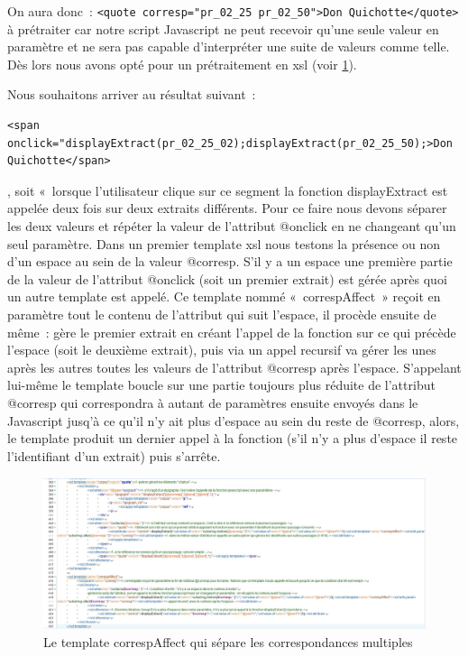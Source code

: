 \documentclass[12pt, a4paper]{article}
\begin{document}
On aura donc~: \verb|<quote corresp="pr_02_25 pr_02_50">Don Quichotte</quote>| à prétraiter car notre script Javascript ne peut recevoir qu'une seule valeur en paramètre et ne sera pas capable d'interpréter une suite de valeurs comme telle. Dès lors nous avons opté pour un prétraitement en xsl (voir \ref{fig:corrspAfect}).


Nous souhaitons arriver au résultat suivant~: \begin{verbatim}<span onclick="displayExtract(pr_02_25_02);displayExtract(pr_02_25_50);>Don
Quichotte</span>\end{verbatim}, soit «~lorsque l'utilisateur clique sur ce segment la fonction displayExtract est appelée deux fois sur deux extraits différents. Pour ce faire nous devons séparer les deux valeurs et répéter la valeur de l'attribut @onclick en ne changeant qu'un seul paramètre. Dans un premier template xsl nous testons la présence ou non d'un espace au sein de la valeur @corresp. S'il y a un espace une première partie de la valeur de l'attribut @onclick (soit un premier extrait) est gérée après quoi un autre template est appelé. Ce template nommé «~correspAffect~» reçoit en paramètre tout le contenu de l'attribut qui suit l'espace, il procède ensuite de même~: gère le premier extrait en créant l'appel de la fonction sur ce qui précède l'espace (soit le deuxième extrait), puis via un appel recursif va gérer les unes après les autres toutes les valeurs de l'attribut @corresp après l'espace. S'appelant lui-même le template boucle sur une partie toujours plus réduite de l'attribut @corresp qui correspondra à autant de paramètres ensuite envoyés dans le Javascript jusq'à ce qu'il n'y ait plus d'espace au sein du reste de @corresp, alors, le template produit un dernier appel à la fonction (s'il n'y a plus d'espace il reste l'identifiant d'un extrait) puis s'arrête.

\begin{figure}[H]
    \centering
    \includegraphics[scale=0.5]{img/screen_quote_xsl.jpg}
    \caption{Le template correspAffect qui sépare les correspondances multiples}
    \label{fig:corrspAfect}
\end{figure}
\end{document}

